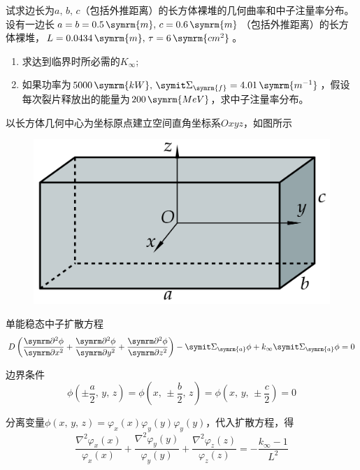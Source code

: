 \begin{exercise}
    试求边长为$a,\,b,\,c$（包括外推距离）的长方体裸堆的几何曲率和中子注量率分布。设有一边长$a = b = 0.5\,\symrm{m},\,c = 0.6\,\symrm{m}$（包括外推距离）的长方体裸堆，$L = 0.0434\,\symrm{m},\,\tau = 6\,\symrm{cm^2}$。
    \begin{enumerate}[(1)]
        \item 求达到临界时所必需的$K_{\infty}$;
        \item 如果功率为$5000\,\symrm{kW},\,\vSigma_{\symrm{f}} = 4.01\,\symrm{m^{-1}}$，假设每次裂片释放出的能量为$200\,\symrm{MeV}$，求中子注量率分布。
    \end{enumerate}
    \begin{solution}
        以长方体几何中心为坐标原点建立空间直角坐标系$Oxyz$，如图所示
        \begin{figure}[H]
            \centering
            \includegraphics[scale=1]{figures/fig4.5.png}
        \end{figure}
        单能稳态中子扩散方程
        \begin{equation*}
            D\left(\pddv{\phi}{x}+\pddv{\phi}{y}+\pddv{\phi}{z}\right) - \vSigma_{\symrm{a}}\phi + k_{\infty}\vSigma_{\symrm{a}}\phi = 0
        \end{equation*}

        边界条件
        \begin{equation*}
            \phi\left(\pm \frac{a}{2},\,y,\,z\right) = \phi\left(x,\,\pm \frac{b}{2},\,z\right) = \phi\left(x,\,y,\,\pm \frac{c}{2}\right) = 0
        \end{equation*}

        分离变量$\phi(x,\,y,\,z) = \varphi_x(x)\varphi_y(y)\varphi_y(y)$，代入扩散方程，得
        \begin{equation*}
            \frac{\nabla^2\varphi_x(x)}{\varphi_x(x)} + \frac{\nabla^2\varphi_y(y)}{\varphi_y(y)} + \frac{\nabla^2\varphi_z(z)}{\varphi_z(z)} = -\frac{k_{\infty}-1}{L^2}
        \end{equation*}


\end{solution}
\end{exercise}
